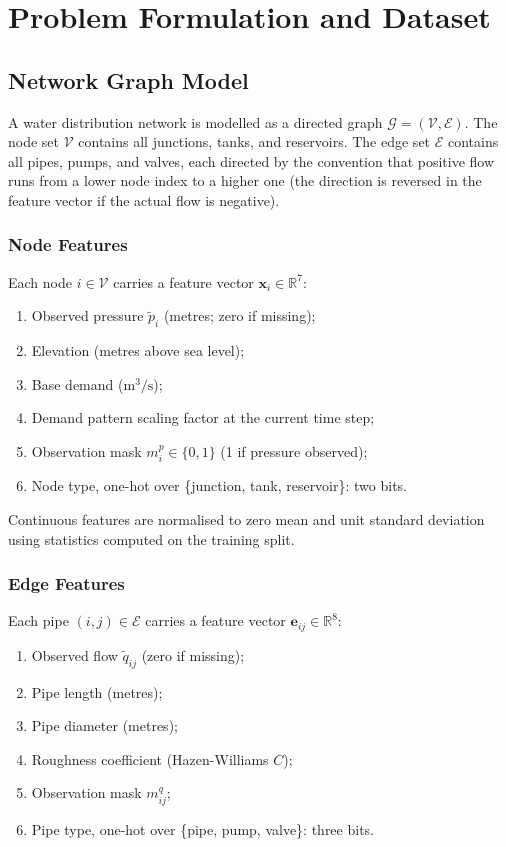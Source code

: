 \chapter{Problem Formulation and Dataset}
\label{ch:problem}

\section{Network Graph Model}
\label{sec:graph_model}

A water distribution network is modelled as a directed graph
$\mathcal{G} = (\mathcal{V}, \mathcal{E})$. The node set
$\mathcal{V}$ contains all junctions, tanks, and reservoirs. The
edge set $\mathcal{E}$ contains all pipes, pumps, and valves, each
directed by the convention that positive flow runs from a lower
node index to a higher one (the direction is reversed in the feature
vector if the actual flow is negative).

\subsection{Node Features}

Each node $i \in \mathcal{V}$ carries a feature vector
$\mathbf{x}_i \in \mathbb{R}^7$:
\begin{enumerate}
  \item Observed pressure $\tilde{p}_i$ (metres; zero if missing);
  \item Elevation (metres above sea level);
  \item Base demand ($\mathrm{m}^3/\mathrm{s}$);
  \item Demand pattern scaling factor at the current time step;
  \item Observation mask $m_i^p \in \{0,1\}$ (1 if pressure observed);
  \item Node type, one-hot over \{junction, tank, reservoir\}: two bits.
\end{enumerate}
Continuous features are normalised to zero mean and unit standard
deviation using statistics computed on the training split.

\subsection{Edge Features}

Each pipe $(i,j) \in \mathcal{E}$ carries a feature vector
$\mathbf{e}_{ij} \in \mathbb{R}^8$:
\begin{enumerate}
  \item Observed flow $\tilde{q}_{ij}$ (zero if missing);
  \item Pipe length (metres);
  \item Pipe diameter (metres);
  \item Roughness coefficient (Hazen-Williams $C$);
  \item Observation mask $m_{ij}^q$;
  \item Pipe type, one-hot over \{pipe, pump, valve\}: three bits.
\end{enumerate}

